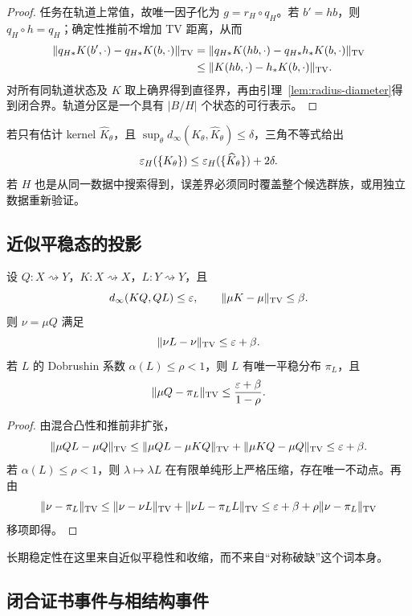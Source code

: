 \begin{proof}
任务在轨道上常值，故唯一因子化为 $g=r_H\circ q_H$。若 $b'=hb$，则 $q_H\circ h=q_H$；确定性推前不增加 TV 距离，从而
\[
\begin{aligned}
\|q_{H*}K(b',\cdot)-q_{H*}K(b,\cdot)\|_{\operatorname{TV}}
&=\|q_{H*}K(hb,\cdot)-q_{H*}h_*K(b,\cdot)\|_{\operatorname{TV}}\\
&\le\|K(hb,\cdot)-h_*K(b,\cdot)\|_{\operatorname{TV}}.
\end{aligned}
\]
对所有同轨道状态及 $K$ 取上确界得到直径界，再由引理~\ref{lem:radius-diameter}得到闭合界。轨道分区是一个具有 $|B/H|$ 个状态的可行表示。
\end{proof}

若只有估计 kernel $\widehat K_\theta$，且
$\sup_\theta d_\infty(K_\theta,\widehat K_\theta)\le\delta$，三角不等式给出
\[
\varepsilon_H(\{K_\theta\})
\le
\varepsilon_H(\{\widehat K_\theta\})+2\delta.
\]
若 $H$ 也是从同一数据中搜索得到，误差界必须同时覆盖整个候选群族，或用独立数据重新验证。

\subsection{近似平稳态的投影}

\begin{proposition}[近似平稳态投影]
\label{prop:stationary-projection}
设 $Q:X\rightsquigarrow Y$，$K:X\rightsquigarrow X$，$L:Y\rightsquigarrow Y$，且
\[
d_\infty(KQ,QL)\le\varepsilon,
\qquad
\|\mu K-\mu\|_{\operatorname{TV}}\le\beta.
\]
则 $\nu=\mu Q$ 满足
\[
\|\nu L-\nu\|_{\operatorname{TV}}\le\varepsilon+\beta.
\]
若 $L$ 的 Dobrushin 系数 $\alpha(L)\le\rho<1$，则 $L$ 有唯一平稳分布 $\pi_L$，且
\[
\|\mu Q-\pi_L\|_{\operatorname{TV}}
\le\frac{\varepsilon+\beta}{1-\rho}.
\]
\end{proposition}

\begin{proof}
由混合凸性和推前非扩张，
\[
\|\mu QL-\mu Q\|_{\operatorname{TV}}
\le\|\mu QL-\mu KQ\|_{\operatorname{TV}}
+\|\mu KQ-\mu Q\|_{\operatorname{TV}}
\le\varepsilon+\beta.
\]
若 $\alpha(L)\le\rho<1$，则 $\lambda\mapsto\lambda L$ 在有限单纯形上严格压缩，存在唯一不动点。再由
\[
\|\nu-\pi_L\|_{\operatorname{TV}}
\le\|\nu-\nu L\|_{\operatorname{TV}}
+\|\nu L-\pi_LL\|_{\operatorname{TV}}
\le\varepsilon+\beta+\rho\|\nu-\pi_L\|_{\operatorname{TV}}
\]
移项即得。
\end{proof}

长期稳定性在这里来自近似平稳性和收缩，而不来自“对称破缺”这个词本身。

\subsection{闭合证书事件与相结构事件}

